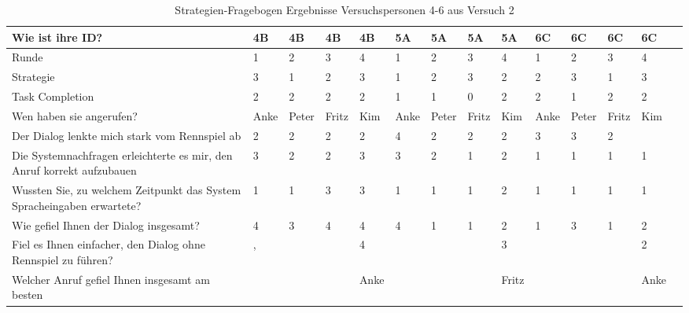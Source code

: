 \documentclass[12pt,a4paper]{scrartcl}
\begin{document}
\begin{appendix}
\begin{table}
\caption{Strategien-Fragebogen Ergebnisse Versuchspersonen 4-6 aus Versuch 2}
\begin{tabular}{|p{6cm}| p{0.8cm} | p{0.8cm} | p{0.8cm} | p{0.8cm} || p{0.8cm} | p{0.8cm} | p{0.8cm} | p{0.8cm} || p{0.8cm} | p{0.8cm} | p{0.8cm} | p{0.8cm} | p{} | }
\hline
	Wie ist ihre ID? & 4B & 4B & 4B & 4B & 5A & 5A & 5A & 5A & 6C & 6C & 6C & 6C \\ \hline \hline
	Runde & 1 & 2 & 3 & 4 & 1 & 2 & 3 & 4 & 1 & 2 & 3 & 4 \\ \hline
	Strategie & 3 & 1 & 2 & 3 & 1 & 2 & 3 & 2 & 2 & 3 & 1 & 3 \\ \hline \hline
	Task Completion & 2 & 2 & 2 & 2 & 1 & 1 & 0 & 2 & 2 & 1 & 2 & 2 \\ \hline \hline
	Wen haben sie angerufen? & Anke & Peter & Fritz & Kim & Anke & Peter & Fritz & Kim & Anke & Peter & Fritz & Kim \\ \hline
	Der Dialog lenkte mich stark vom Rennspiel ab & 2 & 2 & 2 & 2 & 4 & 2 & 2 & 2 & 3 & 3 & 2 &  \\ \hline
	Die Systemnachfragen erleichterte es mir, den Anruf korrekt aufzubauen & 3 & 2 & 2 & 3 & 3 & 2 & 1 & 2 & 1 & 1 & 1 & 1 \\ \hline
	Wussten Sie, zu welchem Zeitpunkt das System Spracheingaben erwartete? & 1 & 1 & 3 & 3 & 1 & 1 & 1 & 2 & 1 & 1 & 1 & 1 \\ \hline
	Wie gefiel Ihnen der Dialog insgesamt? & 4 & 3 & 4 & 4 & 4 & 1 & 1 & 2 & 1 & 3 & 1 & 2 \\ \hline
	Fiel es Ihnen einfacher, den Dialog ohne Rennspiel zu führen? & , &  &  & 4 &  &  &  & 3 &  &  &  & 2 \\ \hline
	Welcher Anruf gefiel Ihnen insgesamt am besten &  &  &  & Anke &  &  &  & Fritz &  &  &  & Anke \\ \hline
\end{tabular}
\end{table}


\end{appendix}
\end{document}
